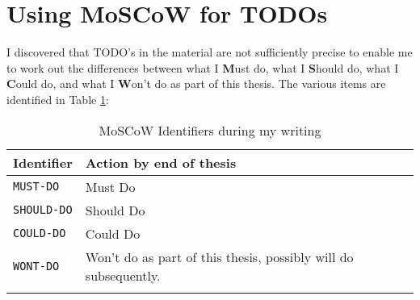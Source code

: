 
\section{Using MoSCoW for TODOs}
I discovered that TODO's in the material are not sufficiently precise to enable me to work out the differences between what I \textbf{M}ust do, what I \textbf{S}hould do, what I \textbf{C}ould do, and what I \textbf{W}on't do as part of this thesis. The various items are identified in Table \ref{tab:moscow_for_todos}:

\begin{table}[htbp!]
    \centering
    \begin{tabular}{l|l}
       Identifier         &Action by end of thesis \\
       \hline
       \texttt{MUST-DO}   &Must Do  \\
       \texttt{SHOULD-DO} &Should Do \\
       \texttt{COULD-DO}  &Could Do \\
       \texttt{WONT-DO}   &Won't do as part of this thesis, possibly will do subsequently. \\
         &
    \end{tabular}
    \caption{MoSCoW Identifiers during my writing}
    \label{tab:moscow_for_todos}
\end{table}

